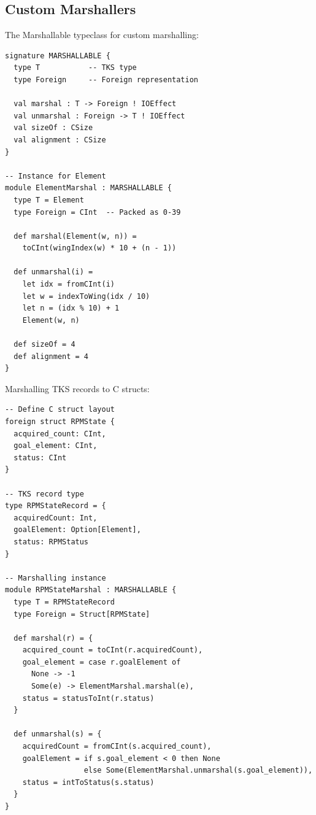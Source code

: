 \subsection{Custom Marshallers}
\label{subsec:custom-marshallers}

\begin{definition}
\label{def:marshallable}
The \textsf{Marshallable} typeclass for custom marshalling:
\begin{verbatim}
signature MARSHALLABLE {
  type T           -- TKS type
  type Foreign     -- Foreign representation

  val marshal : T -> Foreign ! IOEffect
  val unmarshal : Foreign -> T ! IOEffect
  val sizeOf : CSize
  val alignment : CSize
}

-- Instance for Element
module ElementMarshal : MARSHALLABLE {
  type T = Element
  type Foreign = CInt  -- Packed as 0-39

  def marshal(Element(w, n)) =
    toCInt(wingIndex(w) * 10 + (n - 1))

  def unmarshal(i) =
    let idx = fromCInt(i)
    let w = indexToWing(idx / 10)
    let n = (idx % 10) + 1
    Element(w, n)

  def sizeOf = 4
  def alignment = 4
}
\end{verbatim}
\end{definition}

\begin{definition}
\label{def:struct-marshal}
Marshalling TKS records to C structs:
\begin{verbatim}
-- Define C struct layout
foreign struct RPMState {
  acquired_count: CInt,
  goal_element: CInt,
  status: CInt
}

-- TKS record type
type RPMStateRecord = {
  acquiredCount: Int,
  goalElement: Option[Element],
  status: RPMStatus
}

-- Marshalling instance
module RPMStateMarshal : MARSHALLABLE {
  type T = RPMStateRecord
  type Foreign = Struct[RPMState]

  def marshal(r) = {
    acquired_count = toCInt(r.acquiredCount),
    goal_element = case r.goalElement of
      None -> -1
      Some(e) -> ElementMarshal.marshal(e),
    status = statusToInt(r.status)
  }

  def unmarshal(s) = {
    acquiredCount = fromCInt(s.acquired_count),
    goalElement = if s.goal_element < 0 then None
                  else Some(ElementMarshal.unmarshal(s.goal_element)),
    status = intToStatus(s.status)
  }
}
\end{verbatim}
\end{definition}

